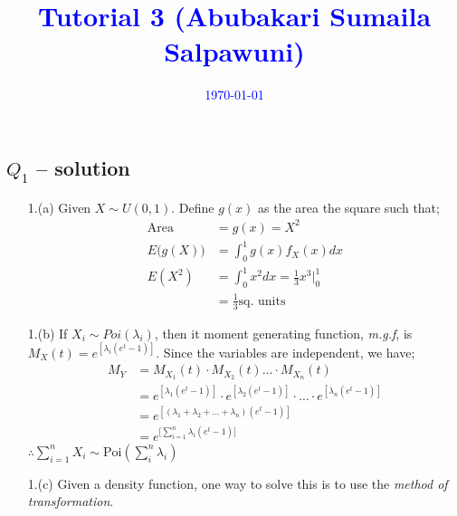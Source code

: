 \documentclass[12pt,a4paper, fleq]{article}
\begin{document}
\title{\textcolor{blue}{Tutorial 3 (Abubakari Sumaila Salpawuni)}}\vskip -3mm

\date{\textcolor{blue}{\today}}
\maketitle

\subsection*{$Q_{1}$ -- solution}

\begin{itemize}
\item[1.(a)] %
Given $X \sim U(0, 1)$. Define $g(x)$ as the area the square such that;
\begin{equation*}
\begin{split}
\mbox{Area} & = g(x) = X^2\\
E\big(g(X)\big) &= \int_0^1 g(x)f_X(x)dx\\
E(X^2) & = \int_0^1 x^2 dx = \frac13x^3\bigg\lvert_0^1\\
& = \frac 13 \mbox{sq. units}
\end{split}
\end{equation*}

\item[1.(b)] %
If $X_i \sim Poi(\lambda_i)$, then it moment generating function, {\it m.g.f}, is $M_X(t) = e^{[\lambda_i(e^t - 1)]}$. Since the variables are independent, we have;
\begin{equation*}
\begin{split}
M_Y & = M_{X_1}(t) \cdot M_{X_2}(t)\ldots \cdot M_{X_n}(t)\\
& = e^{[\lambda_1 (e^t - 1)]} \cdot e^{[\lambda_2 (e^t - 1)]} \cdot \ldots \cdot e^{[\lambda_n (e^t - 1)]}\\
& = e^{[(\lambda_1 + \lambda_2 + \ldots + \lambda_n)(e^t - 1)]}\\
& = e^{[\sum_{i=1}^n\lambda_i{(e^t - 1)]}}
\end{split}
\end{equation*}
$\therefore  \sum_{i=1}^n X_i \sim \mbox{Poi} (\sum_i^n\lambda_i)$

\item[1.(c)] %
Given a density function, one way to solve this is to use  the {\it method of transformation}.


\end{itemize}
\end{document}
